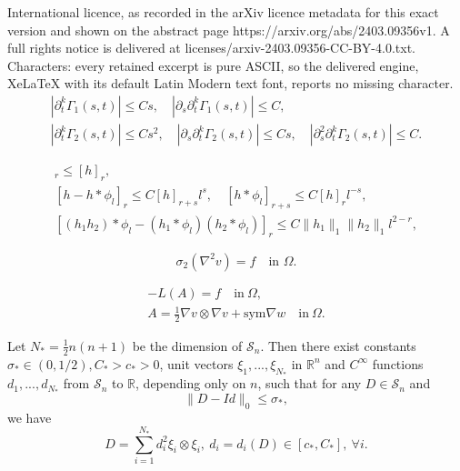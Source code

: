 \documentclass[10pt,a4paper]{amsart}
\newcommand{\R}{\mathbb{R}}
\newcommand{\sym}{\text{sym}}
\renewcommand{\S}{{\mathcal{S}_n}}
\begin{document}
International licence, as recorded in the arXiv licence metadata for this exact version and shown on the abstract page https://arxiv.org/abs/2403.09356v1. A full rights notice is delivered at licenses/arxiv-2403.09356-CC-BY-4.0.txt. Characters: every retained excerpt is pure ASCII, so the delivered engine, XeLaTeX with its default Latin Modern text font, reports no missing character.
\begin{equation}\label{bounds}
\begin{aligned}
    |\partial_t^k\Gamma_1(s,t)|\le Cs,\quad |\partial_s\partial_t^k\Gamma_1(s,t)|\le C,\\
    |\partial_t^k\Gamma_2(s,t)|\le Cs^2,\quad |\partial_s\partial_t^k\Gamma_2(s,t)|\le Cs,\quad |\partial_s^2\partial_t^k\Gamma_2(s,t)|\le C.
\end{aligned}
\end{equation}

\begin{gather}
    [h*\phi_l]_{r}\le [h]_{r}, \label{phil3}\\
    [h-h*\phi_l]_{r}\le C[h]_{r+s}l^{s},\quad [h*\phi_l]_{r+s}\le C[h]_r l^{-s},\label{phil1}\\
    [(h_1h_2)*\phi_l-(h_1*\phi_l)(h_2*\phi_l)]_r\le C\|h_1\|_1\|h_2\|_1 l^{2-r},\label{phil2}
\end{gather}

\begin{equation}\label{1}
    \sigma_2(\nabla^2 v) = f \quad\text{in }\Omega.
\end{equation}

\begin{align}
    -L(A)=f\quad\text{in}\ \Omega, \label{2}\\
    A=\frac{1}{2}\nabla v\otimes\nabla v+\sym\nabla w\quad\text{in}\ \Omega.\label{4}
\end{align}

\begin{lem}\label{lem2}
    Let $N_*=\frac{1}{2}n(n+1)$ be the dimension of $\S$. Then there exist constants $\sigma_*\in(0,1/2), C_*>c_*>0$, unit vectors $ \xi_1,..., \xi_{N_*}$ in $\R^n$ and $C^\infty$ functions $d_1,...,d_{N_*}$ from $\S$ to $\R$, depending only on $n$, such that for any $D\in\S$ and
    \begin{equation*}
	\|D-Id\|_0\le\sigma_*,
    \end{equation*}
    we have
    \begin{equation*}
        D=\sum_{i=1}^{N_*}d_i^2 \xi_i\otimes \xi_i,\ d_i=d_i(D)\in[c_*,C_*],\ \forall i.
    \end{equation*}
\end{lem}
\end{document}
